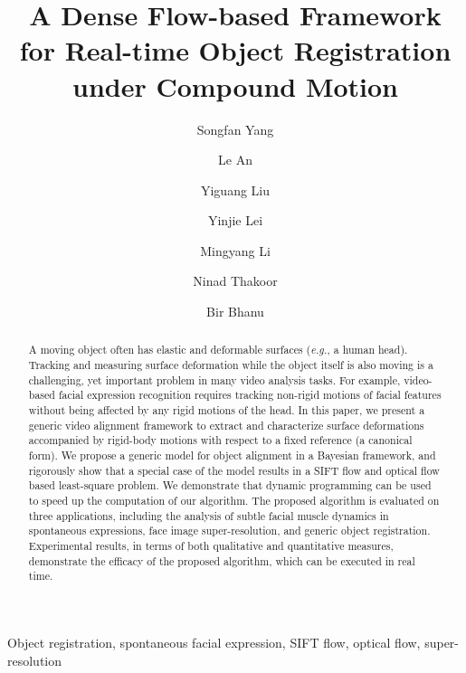 \documentclass[review]{elsarticle}
\begin{document}
\begin{frontmatter}

\title{A Dense Flow-based Framework for Real-time Object Registration under Compound Motion}

\author[SCU_ECE]{Songfan Yang}
\author[UNC]{Le An}
\author[SCU_CS]{Yiguang Liu}
\author[SCU_ECE]{Yinjie Lei}
\author[Google]{Mingyang Li}
\author[UCR]{Ninad Thakoor}
\author[UCR]{Bir Bhanu}

\address[SCU_ECE]{College of Electronics and Information Engineering, Sichuan University, China}
\address[UNC]{University of North Carolina at Chapel Hill, USA}
\address[SCU_CS]{School of Computer Science, Sichuan University, China}
\address[Google]{Google Inc., Mountain View, USA}
\address[UCR]{Center for Research in Intelligent Systems, University of California, Riverside, USA}

\begin{abstract}
A moving object often has elastic and deformable surfaces (\textit{e.g.}, a human head). Tracking and measuring surface deformation while the object itself is also moving is a challenging, yet important problem in many video analysis tasks. For example, video-based facial expression recognition requires tracking non-rigid motions of facial features without being affected by any rigid motions of the head. In this paper, we present a generic video alignment framework to extract and characterize surface deformations accompanied by rigid-body motions with respect to a fixed reference (a canonical form). We propose a generic model for object alignment in a Bayesian  framework, and rigorously show that a special case of the model results in a SIFT flow and optical flow based least-square problem. We demonstrate that dynamic programming can be used to speed up the computation of our algorithm. The proposed algorithm is evaluated on three applications, including the analysis of subtle facial muscle dynamics in spontaneous expressions, face image super-resolution, and generic object registration. Experimental results, in terms of both qualitative and quantitative measures, demonstrate the efficacy of the proposed algorithm, which can be executed in real time.
\end{abstract}

\begin{keyword}
Object registration, spontaneous facial expression, SIFT flow, optical flow, super-resolution
\end{keyword}

\end{frontmatter}
\end{document}
